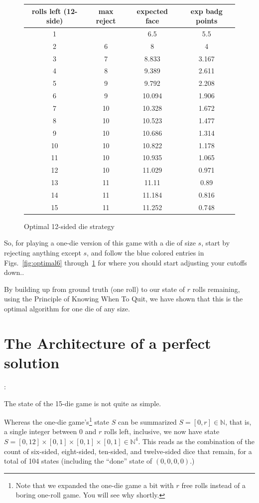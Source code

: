 \documentclass[11pt, oneside]{article} 	%
\begin{document}
\begin{figure}[!htb]
\begin{tabular}{c | c c c}
rolls left (12-side) & max reject & expected face & exp badg points \\
\hline

1 &  & 6.5 & 5.5 \\
2 & \cellcolor{cyan} 6 & 8 & 4 \\
3 & \cellcolor{cyan} 7 & 8.833 & 3.167 \\
4 &\cellcolor{cyan}  8 & 9.389 & 2.611 \\
5 & 9 & 9.792 & 2.208 \\
6 & \cellcolor{cyan} 9 & 10.094 & 1.906 \\
7 & 10 & 10.328 & 1.672 \\
8 & 10 & 10.523 & 1.477 \\
9 & 10 & 10.686 & 1.314 \\
10 & 10 & 10.822 & 1.178 \\
11 & 10 & 10.935 & 1.065 \\
12 & \cellcolor{cyan} 10 & 11.029 & 0.971 \\
13 & 11 & 11.11 & 0.89 \\
14 & 11 & 11.184 & 0.816 \\
15 & 11 & 11.252 & 0.748 \\
\end{tabular}
\caption{Optimal 12-sided die strategy}
\label{fig:optimal12}
\end{figure}

So, for playing a one-die version of this game with a die of size $s$, start by rejecting anything except $s$, and follow the blue colored entries in Figs.~\ref{fig:optimal6} through~\ref{fig:optimal12} for where you should start adjusting your cutoffs down..

By building up from ground truth (one roll) to our state of $r$ rolls remaining, using the Principle of Knowing When To Quit, we have shown that this is the optimal algorithm for one die of any size.

\section{The Architecture of a perfect solution} \label{section:solve-perfect}: 

The state of the 15-die game is not quite as simple.

Whereas the one-die game's\footnote{Note that we expanded the one-die game a bit with $r$ free rolls instead of a boring one-roll game. You will see why shortly.} state $S$  can be summarized $S = [0,r] \in \mathbb{N}$, that is, a single integer between $0$ and $r$ rolls left, inclusive, we now have state $S = [0,12] \times [0,1] \times [0,1] \times [0,1] \in \mathbb{N}^4$. This reads as the combination of the count of six-sided, eight-sided, ten-sided, and twelve-sided dice that remain, for a total of 104 states (including the ``done'' state of $(0,0,0,0)$.)
\end{document}

